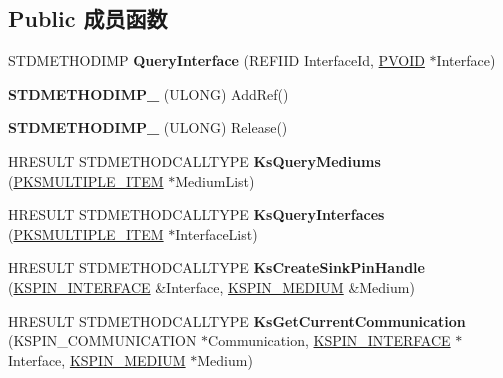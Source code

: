 \subsection*{Public 成员函数}
\begin{DoxyCompactItemize}
\item 
\mbox{\label{class_c_output_pin_a338349989a33c46170294cda4f8f5066}} 
S\+T\+D\+M\+E\+T\+H\+O\+D\+I\+MP {\bfseries Query\+Interface} (R\+E\+F\+I\+ID Interface\+Id, \hyperlink{interfacevoid}{P\+V\+O\+ID} $\ast$Interface)
\item 
\mbox{\label{class_c_output_pin_ae21a82bd818164bcd42b6a85e11c9e4a}} 
{\bfseries S\+T\+D\+M\+E\+T\+H\+O\+D\+I\+M\+P\+\_\+} (U\+L\+O\+NG) Add\+Ref()
\item 
\mbox{\label{class_c_output_pin_af7b48e25a99744e66d576440c62c8db8}} 
{\bfseries S\+T\+D\+M\+E\+T\+H\+O\+D\+I\+M\+P\+\_\+} (U\+L\+O\+NG) Release()
\item 
\mbox{\label{class_c_output_pin_a78cbfabf1bd1133738e3f75d65249803}} 
H\+R\+E\+S\+U\+LT S\+T\+D\+M\+E\+T\+H\+O\+D\+C\+A\+L\+L\+T\+Y\+PE {\bfseries Ks\+Query\+Mediums} (\hyperlink{struct_k_s_m_u_l_t_i_p_l_e___i_t_e_m}{P\+K\+S\+M\+U\+L\+T\+I\+P\+L\+E\+\_\+\+I\+T\+EM} $\ast$Medium\+List)
\item 
\mbox{\label{class_c_output_pin_abacd744b5464ad04956aef59567b69e3}} 
H\+R\+E\+S\+U\+LT S\+T\+D\+M\+E\+T\+H\+O\+D\+C\+A\+L\+L\+T\+Y\+PE {\bfseries Ks\+Query\+Interfaces} (\hyperlink{struct_k_s_m_u_l_t_i_p_l_e___i_t_e_m}{P\+K\+S\+M\+U\+L\+T\+I\+P\+L\+E\+\_\+\+I\+T\+EM} $\ast$Interface\+List)
\item 
\mbox{\label{class_c_output_pin_afe9be9d93e4b4d3d7be80c579b78dc9b}} 
H\+R\+E\+S\+U\+LT S\+T\+D\+M\+E\+T\+H\+O\+D\+C\+A\+L\+L\+T\+Y\+PE {\bfseries Ks\+Create\+Sink\+Pin\+Handle} (\hyperlink{struct_k_s_i_d_e_n_t_i_f_i_e_r}{K\+S\+P\+I\+N\+\_\+\+I\+N\+T\+E\+R\+F\+A\+CE} \&Interface, \hyperlink{struct_k_s_i_d_e_n_t_i_f_i_e_r}{K\+S\+P\+I\+N\+\_\+\+M\+E\+D\+I\+UM} \&Medium)
\item 
\mbox{\label{class_c_output_pin_ae98aecc7c4b17daa53245a3e0a2e2b54}} 
H\+R\+E\+S\+U\+LT S\+T\+D\+M\+E\+T\+H\+O\+D\+C\+A\+L\+L\+T\+Y\+PE {\bfseries Ks\+Get\+Current\+Communication} (K\+S\+P\+I\+N\+\_\+\+C\+O\+M\+M\+U\+N\+I\+C\+A\+T\+I\+ON $\ast$Communication, \hyperlink{struct_k_s_i_d_e_n_t_i_f_i_e_r}{K\+S\+P\+I\+N\+\_\+\+I\+N\+T\+E\+R\+F\+A\+CE} $\ast$Interface, \hyperlink{struct_k_s_i_d_e_n_t_i_f_i_e_r}{K\+S\+P\+I\+N\+\_\+\+M\+E\+D\+I\+UM} $\ast$Medium)

\end{DoxyCompactItemize}
